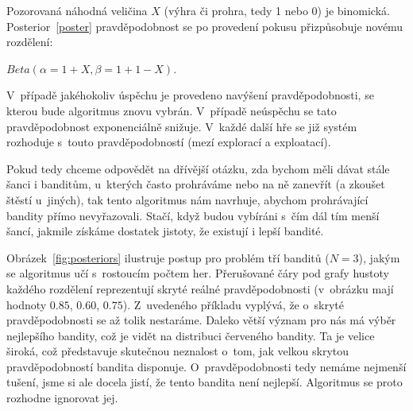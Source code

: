 \documentclass[thesis=M,czech]{FITthesis}[2014/05/07]
\begin{document}
Pozorovaná náhodná veličina $X$ (výhra či prohra, tedy 1 nebo 0) je binomická. Posterior~\ref{poster} pravděpodobnost se po provedení pokusu přizpůsobuje novému rozdělení:

\begin{center}
${Beta}(\alpha = 1 + X, \beta = 1 + 1 - X)$.
\end{center}

V~případě jakéhokoliv úspěchu je provedeno navýšení pravděpodobnosti, se kterou bude algoritmus znovu vybrán. V~případě neúspěchu se tato pravděpodobnost exponenciálně snižuje. V~každé další hře se již systém rozhoduje s~touto pravděpodobností (mezí explorací a exploatací).

Pokud tedy chceme odpovědět na dřívější otázku, zda bychom měli dávat stále šanci i banditům, u~kterých často prohráváme nebo na ně zanevřít (a zkoušet štěstí u~jiných), tak tento algoritmus nám navrhuje, abychom prohrávající bandity přímo nevyřazovali. Stačí, když budou vybíráni s~čím dál tím menší šancí, jakmile získáme dostatek jistoty, že existují i lepší bandité. 

Obrázek~\ref{fig:posteriors} ilustruje postup pro problém tří banditů ($N = 3$), jakým se algoritmus učí s~rostoucím počtem her. Přerušované čáry pod grafy hustoty každého rozdělení reprezentují skryté reálné pravděpodobnosti (v~obrázku mají hodnoty $0.85$, $0.60$, $0.75$). Z~uvedeného příkladu vyplývá, že o~skryté pravděpodobnosti se až tolik nestaráme. Daleko větší význam pro nás má výběr nejlepšího bandity, což je vidět na distribuci červeného bandity. Ta je velice široká, což představuje skutečnou neznalost o~tom, jak velkou skrytou pravděpodobností bandita disponuje. O~pravděpodobnosti tedy nemáme nejmenší tušení, jsme si ale docela jistí, že tento bandita není nejlepší. Algoritmus se proto rozhodne ignorovat jej.
\end{document}
